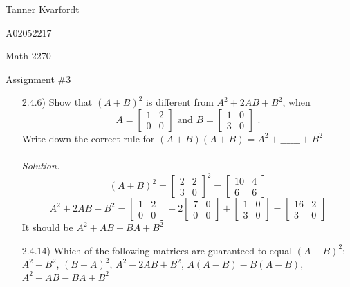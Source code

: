 \documentclass[12pt]{article}
\begin{document}
\hfill Tanner Kvarfordt 

\hfill A02052217

\hfill Math 2270

\hfill Assignment \#3


\begin{itemize}
\item[2.4.6)] Show that $(A+B)^2$ is different from $A^2+2AB+B^2$, when 
\begin{equation*} A =
\left[\begin{array}{cc} 1 & 2 \\ 0 & 0\end{array}\right] \text{  and  }
B =
\left[\begin{array}{cc} 1 & 0 \\ 3 & 0\end{array}\right] \text{  .}
\end{equation*}
Write down the correct rule for $(A+B)(A+B)= A^2 + \_\_\_\_\_\_ + B^2$ \\ \\
\textit{Solution.} 
\begin{equation*}
(A+B)^2 = \left[\begin{array}{cc} 2 & 2 \\ 3 & 0\end{array}\right]^2 = 
\left[\begin{array}{cc} 10 & 4 \\ 6 & 6\end{array}\right]
\end{equation*}
\begin{equation*}
A^2+2AB+B^2 = \left[\begin{array}{cc} 1 & 2 \\ 0 & 0\end{array}\right] + 
2\left[\begin{array}{cc} 7 & 0 \\ 0 & 0\end{array}\right] + \left[\begin{array}{cc} 1 & 0 \\ 3 & 0\end{array}\right] =
\left[\begin{array}{cc} 16 & 2 \\ 3 & 0\end{array}\right]
\end{equation*}
It should be $A^2+AB+BA+B^2$

\item[2.4.14)] Which of the following matrices are guaranteed to equal $(A-B)^2$: \\
$A^2-B^2$, $(B-A)^2$, $A^2-2AB+B^2$, $A(A-B)-B(A-B)$, $A^2-AB-BA+B^2$


\end{itemize}
\end{document}
